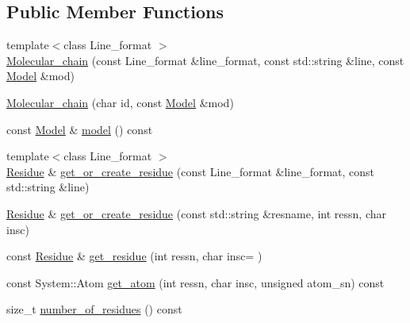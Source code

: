 \subsection*{Public Member Functions}
\begin{DoxyCompactItemize}
\item 
{\footnotesize template$<$class Line\+\_\+format $>$ }\\\hyperlink{classESBTL_1_1Molecular__chain_a4652d6763dcfcf123450737ebb6eaf5a}{Molecular\+\_\+chain} (const Line\+\_\+format \&line\+\_\+format, const std\+::string \&line, const \hyperlink{classESBTL_1_1Molecular__chain_a91de91fd0923cf2e00d947b76851be68}{Model} \&mod)
\item 
\hyperlink{classESBTL_1_1Molecular__chain_a6a6ccadbd35d571991d63058f9d2b571}{Molecular\+\_\+chain} (char id, const \hyperlink{classESBTL_1_1Molecular__chain_a91de91fd0923cf2e00d947b76851be68}{Model} \&mod)
\item 
const \hyperlink{classESBTL_1_1Molecular__chain_a91de91fd0923cf2e00d947b76851be68}{Model} \& \hyperlink{classESBTL_1_1Molecular__chain_a6383517afc2e91d6a4b1c6759fb0fe24}{model} () const
\item 
{\footnotesize template$<$class Line\+\_\+format $>$ }\\\hyperlink{classESBTL_1_1Molecular__chain_a59b61e0ecde5fb4c3d1765a37c9cf6cb}{Residue} \& \hyperlink{classESBTL_1_1Molecular__chain_a4b4f28e5fde3c5b42f1bb236f21c6c5d}{get\+\_\+or\+\_\+create\+\_\+residue} (const Line\+\_\+format \&line\+\_\+format, const std\+::string \&line)
\item 
\hyperlink{classESBTL_1_1Molecular__chain_a59b61e0ecde5fb4c3d1765a37c9cf6cb}{Residue} \& \hyperlink{classESBTL_1_1Molecular__chain_aa35aa61329884011dc85906c387df84c}{get\+\_\+or\+\_\+create\+\_\+residue} (const std\+::string \&resname, int ressn, char insc)
\item 
const \hyperlink{classESBTL_1_1Molecular__chain_a59b61e0ecde5fb4c3d1765a37c9cf6cb}{Residue} \& \hyperlink{classESBTL_1_1Molecular__chain_add9e2713daf6374d29fc32bd0dc93ccf}{get\+\_\+residue} (int ressn, char insc=\textquotesingle{} \textquotesingle{})
\item 
const System\+::\+Atom \hyperlink{classESBTL_1_1Molecular__chain_a79ec125306145c87a869a1d966700c75}{get\+\_\+atom} (int ressn, char insc, unsigned atom\+\_\+sn) const
\item 
size\+\_\+t \hyperlink{classESBTL_1_1Molecular__chain_ae2cb5ee5dddeb528c705e293d575e0a1}{number\+\_\+of\+\_\+residues} () const
\item 

\end{DoxyCompactItemize}
